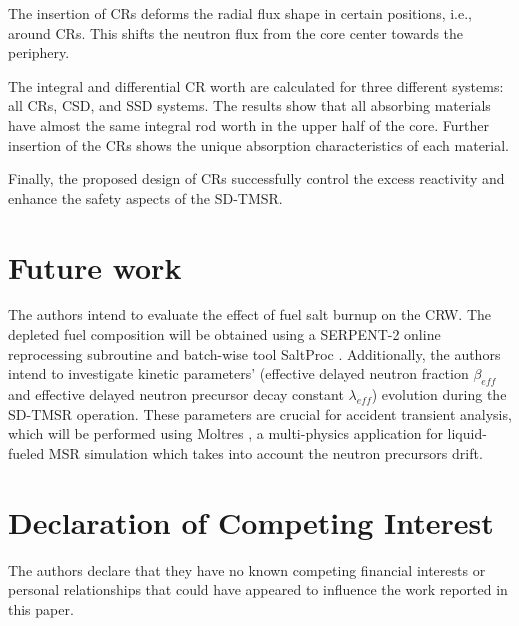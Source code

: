 The insertion of CRs deforms the radial flux shape in certain positions, i.e., around CRs. This shifts the neutron flux from the core center towards the periphery.

The integral and differential CR worth are calculated for three 
different systems: all CRs, CSD, and SSD systems. The results show 
that all absorbing materials have almost the same integral rod worth in the 
upper half of the core. Further insertion of the CRs shows the unique 
absorption characteristics of each material.

Finally, the proposed design of CRs successfully control the excess reactivity and enhance the safety aspects of the SD-TMSR.

\section{Future work}
The authors intend to evaluate the effect of fuel salt 
burnup on the CRW. The depleted fuel composition will be obtained using a
SERPENT-2 online reprocessing subroutine and 
batch-wise tool SaltProc \cite{rykhlevskii_milestone_2019}. Additionally, the authors intend to investigate 
kinetic parameters' (effective delayed neutron fraction $\beta_{eff}$ and 
effective delayed neutron precursor decay constant $\lambda_{eff}$) evolution 
during the SD-TMSR operation. These parameters are crucial for accident 
transient analysis, which will be performed using Moltres 
\cite{lindsay_introduction_2018}, a multi-physics application for liquid-fueled MSR 
simulation which takes into account the neutron precursors drift.

\section{Declaration of Competing Interest}

The authors declare that they have no known competing financial interests or personal relationships that could have appeared to influence the work reported in this paper.
